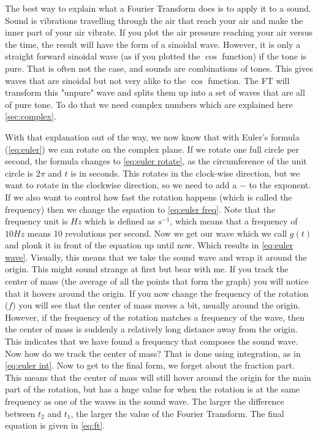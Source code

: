 The best way to explain what a Fourier Transform does is to apply it to a sound. Sound is vibrations travelling through the air that reach your air and make the inner part of your air vibrate.
If you plot the air pressure reaching your air versus the time, the result will have the form of a sinoidal wave. However, it is only a straight forward sinoidal wave (as if you plotted the 
$\cos$ function) if the tone is pure. That is often not the case, and sounds are combinations of tones. This gives waves that are sinoidal but not very alike to the $\cos$ function. The FT will
transform this "unpure" wave and splits them up into a set of waves that are all of pure tone. To do that we need complex numbers which are explained here \autoref{sec:complex}. 

With that explanation out of the way, we now know that with Euler's formula (\autoref{eq:euler}) we can rotate on the complex plane. If we rotate one full circle per second, the formula changes 
to \autoref{eq:euler rotate}, as the circumference of the unit circle is $2\pi$ and $t$ is in seconds. This rotates in the clock-wise direction, but we want to rotate in the clockwise direction, 
so we need to add a $-$ to the exponent. If we also want to control how fast the rotation happens (which is called the frequency) then we change the equation to \autoref{eq:euler freq}. Note that
the frequency unit is $Hz$ which is defined as $s^{-1}$, which means that a frequency of $10 Hz$ means 10 revolutions per second. Now we get our wave which we call $g(t)$ and plonk it in front 
of the equation up until now. Which results in \autoref{eq:euler wave}. Visually, this means that we take the sound wave and wrap it around the origin. This might sound strange at first but bear 
with me. If you track the center of mass (the average of all the points that form the graph) you will notice that it hovers around the origin. If you now change the frequency of the rotation ($f$)
you will see that the center of mass moves a bit, usually around the origin. However, if the frequency of the rotation matches a frequency of the wave, then the center of mass is suddenly a 
relatively long distance away from the origin. This indicates that we have found a frequency that composes the sound wave. Now how do we track the center of mass? That is done using integration,
as in \autoref{eq:euler int}. Now to get to the final form, we forget about the fraction part. This means that the center of mass will still hover around the origin for the main part of the 
rotation, but has a huge value for when the rotation is at the same frequency as one of the waves in the sound wave. The larger the difference between $t_2$ and $t_1$, the larger the value of the
Fourier Transform. The final equation is given in \autoref{eq:ft}.

